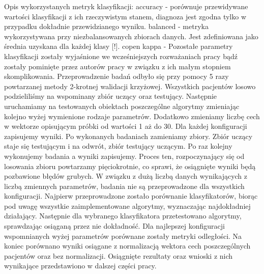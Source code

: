 \documentclass[12pt]{article}
\begin{document}
Opis wykorzystanych metryk klasyfikacji:
\newline
accuracy - porównuje przewidywane wartości klasyfikacji z ich rzeczywistym stanem, diagnoza jest zgodna tylko w przypadku dokładnie przewidzianego wyniku.
\newline
balanced - metryka wykorzystywana przy niezbalansowanych zbiorach danych. Jest zdefiniowana jako średnia uzyskana dla każdej klasy [!].
\newline
copen kappa -  
\newline\newline
\indent Pozostałe parametry klasyfikacji zostały wyjaśnione we wcześniejszych rozważaniach pracy bądź zostały pominięte przez autorów pracy w związku z ich małym stopniem skomplikowania.
\newline
\indent  Przeprowadzenie badań odbyło się przy pomocy 5 razy powtarzanej metody 2-krotnej walidacji krzyżowej. Wszystkich pacjentów losowo podzieliliśmy na wspominany zbiór uczący oraz testujący. Następnie uruchamiamy na testowanych obiektach poszczególne algorytmy zmieniając kolejno wyżej wymienione rodzaje parametrów. Dodatkowo zmieniamy liczbę cech w wektorze opisującym próbki od wartości 1 aż do 30. Dla każdej konfiguracji zapisujemy wyniki. Po wykonanych badaniach zamieniamy zbiory. Zbiór uczący staje się testującym i na odwrót, zbiór testujący uczącym. Po raz kolejny wykonujemy badania a wyniki zapisujemy. Proces ten, rozpoczynający się od losowania zbioru powtarzamy pięciokrotnie, co sprawi, że osiągnięte wyniki będą pozbawione błędów grubych.
\newline
\indent W związku z dużą liczbą danych wynikających z liczbą zmiennych parametrów, badania nie są przeprowadzone dla wszystkich konfiguracji. Najpierw przeprowadzone zostało porównanie klasyfikatorów, biorąc pod uwagę wszystkie zaimplementowane algorytmy, wyznaczając najdokładniej działający. Następnie dla wybranego klasyfikatora przetestowano algorytmy, sprawdzając osiąganą przez nie dokładność. Dla najlepszej konfiguracji wspomnianych wyżej parametrów porównane zostały metryki odległości. Na koniec porównano wyniki osiągane z normalizacją wektora cech poszczególnych pacjentów oraz bez normalizacji. Osiągnięte rezultaty oraz wnioski z nich wynikające przedstawiono w dalszej części pracy.

\end{document}
